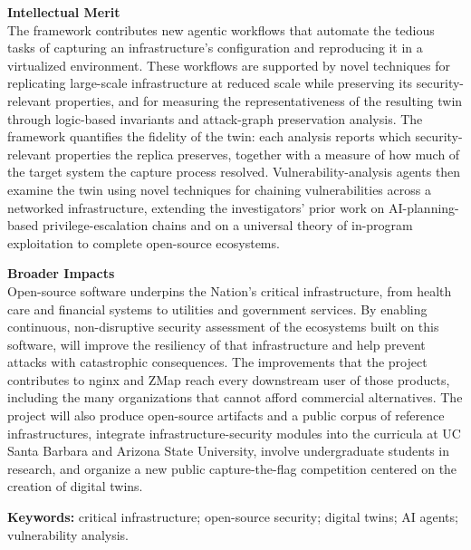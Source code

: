 \vspace{0.2ex}
\noindent\textbf{Intellectual Merit}\\
The \sysname framework contributes new agentic workflows that automate the
tedious tasks of capturing an infrastructure's configuration and reproducing
it in a virtualized environment. These workflows are supported by novel
techniques for replicating large-scale infrastructure at reduced scale while
preserving its security-relevant properties, and for measuring the
representativeness of the resulting twin through logic-based invariants and
attack-graph preservation analysis. The framework quantifies the fidelity of the twin: each analysis reports
which security-relevant properties the replica preserves, together with a
measure of how much of the target system the capture process resolved. Vulnerability-analysis agents then examine the twin using novel techniques
for chaining vulnerabilities across a networked infrastructure, extending the
investigators' prior work on AI-planning-based privilege-escalation chains
and on a universal theory of in-program exploitation to complete
open-source ecosystems.

\vspace{0.2ex}
\noindent\textbf{Broader Impacts}\\
Open-source software underpins the Nation's critical infrastructure, from
health care and financial systems to utilities and government services. By
enabling continuous, non-disruptive security assessment of the ecosystems
built on this software, \sysname will improve the resiliency of that
infrastructure and help prevent attacks with catastrophic consequences. The improvements that the project contributes to nginx and ZMap
reach every downstream user of those products, including the many
organizations that cannot afford commercial alternatives. The project will
also produce open-source artifacts and a public corpus of reference
infrastructures, integrate infrastructure-security modules into the curricula
at UC Santa Barbara and Arizona State University, involve undergraduate students in research, and organize a new public capture-the-flag
competition centered on the creation of digital twins.

\vspace{0.2ex}
\noindent\textbf{Keywords:} critical infrastructure; open-source security; digital twins; AI agents; vulnerability analysis.
